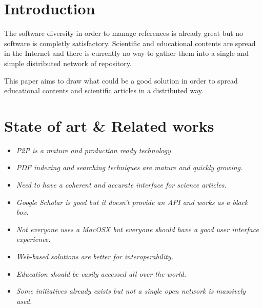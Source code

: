\section{Introduction}

The software diversity in order to manage references is already
great but no software is completly satisfactory. Scientific and
educational contents are spread in the Internet and there is currently
no way to gather them into a single and simple distributed network of repository.

This paper aims to draw what could be a good solution in order to
spread educational contents and scientific articles in a distributed
way.


\section{State of art \& Related works}

\begin{itemize}

\item \textit{P2P is a mature and production ready technology.}

\item \textit{PDF indexing and searching techniques are mature and quickly growing.}

\item \textit{Need to have a coherent and accurate interface for science articles.}

\end{itemize}

\begin{itemize}

\item \textit{Google Scholar is good but it doesn't provide an API and works as a black box.}

\item \textit{Not everyone uses a MacOSX but everyone should have a good user interface experience.}

\item \textit{Web-based solutions are better for interoperability.}

\item \textit{Education should be easily accessed all over the world.}

\item \textit{Some initiatives already exists but not a single open network is massively used.}

\end{itemize}

